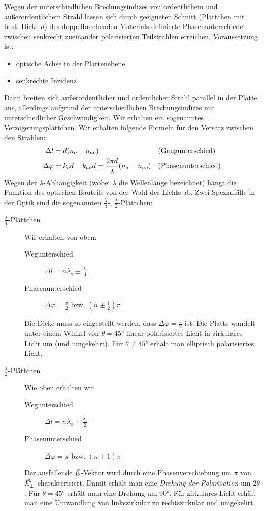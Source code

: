 Wegen der unterschiedlichen Brechungsindizes von ordentlichem und
außerordentlichem Strahl lassen sich durch geeigneten Schnitt
(Plättchen mit best. Dicke $d$) des
doppelbrechenden Materials definierte Phasenunterschiede zwischen
senkrecht zueinander polarisierten Teilstrahlen erreichen.
Voraussetzung ist:
\begin{itemize}
\item optische Achse in der Plattenebene
\item senkrechte Inzidenz
\end{itemize}
Dann breiten sich außerordentlicher und ordentlicher Strahl parallel
in der Platte aus, allerdings aufgrund der unterschiedlichen
Brechungsindizes mit unterschiedlicher Geschwindigkeit. Wir erhalten
ein sogenanntes Verzögerungsplättchen.
Wir erhalten folgende Formeln für den Versatz zwischen den Strahlen:
\begin{align*}
  \Delta l &= d(n_o-n_{ao}) 
  &&\text{(Gangunterschied\index{Doppelbrechung!Gangunterschied})}\\
  \Delta\varphi &= k_od - k_{ao}d = \frac{2\pi d}{\lambda}(n_a-n_{ao})
  &&\text{(Phasenunterschied\index{Doppelbrechung!Phasenunterschied})}
\end{align*}
Wegen der $\lambda$-Abhängigkeit (wobei $\lambda$ die Wellenlänge
bezeichnet) hängt die Funktion des optischen Bauteils von der Wahl des
Lichts ab. Zwei Spezialfälle in der Optik sind die sogenannten
$\frac{\lambda}{4}$-, $\frac{\lambda}{2}$-Plättchen:
\begin{description}
\item[$\frac{\lambda}{4}$-Plättchen] Wir erhalten von oben:
  \begin{description}
  \item[Wegunterschied] $\Delta l = n\lambda_o \pm \frac{\lambda_o}{4}$
  \item[Phasenunterschied] $\Delta\varphi = \frac{\pi}{2}$
    bzw. $(n\pm \frac{1}{2})\pi$
  \end{description}
  Die Dicke muss so eingestellt werden, dass
  $\Delta\varphi=\frac{\pi}{2}$ ist. Die Platte wandelt unter einem
  Winkel von $\theta=\ang{45}$ linear polarisiertes Licht in
  zirkulares Licht um (und umgekehrt).
  Für $\theta\neq\ang{45}$ erhält man elliptisch polarisiertes Licht.
\item[$\frac{\lambda}{2}$-Plättchen] Wie oben erhalten wir
  \begin{description}
    \item[Wegunterschied] $\Delta l = n\lambda_o \pm \frac{\lambda_o}{2}$
    \item[Phasenunterschied] $\Delta\varphi = \pi$
      bzw. $(n+1)\pi$
  \end{description}
  Der ausfallende $\vec{E}$-Vektor wird durch eine Phasenverschiebung
  um $\pi$ von $\vec{E}_\bot^\prime$ charakterisiert.
  Damit erhält man eine \emph{Drehung der Polarisation} um $2\theta$.
  Für $\theta=\ang{45}$ erhält man eine Drehung um \ang{90}.
  Für zirkulares Licht erhält man eine Umwandlung von linkszirkular zu
  rechtszirkular und umgekehrt.
\end{description}

